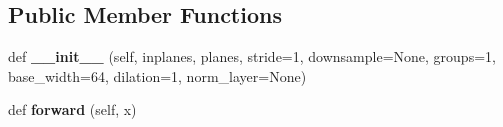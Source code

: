 \subsection*{Public Member Functions}
\begin{DoxyCompactItemize}
\item 
\mbox{\label{classtorchvision_1_1models_1_1resnet_1_1Bottleneck_a52840e04f36e48cfed3672428ae4de45}} 
def {\bfseries \+\_\+\+\_\+init\+\_\+\+\_\+} (self, inplanes, planes, stride=1, downsample=None, groups=1, base\+\_\+width=64, dilation=1, norm\+\_\+layer=None)
\item 
\mbox{\label{classtorchvision_1_1models_1_1resnet_1_1Bottleneck_a9eef0addb186e314327d2dd2c219016e}} 
def {\bfseries forward} (self, x)
\end{DoxyCompactItemize}
